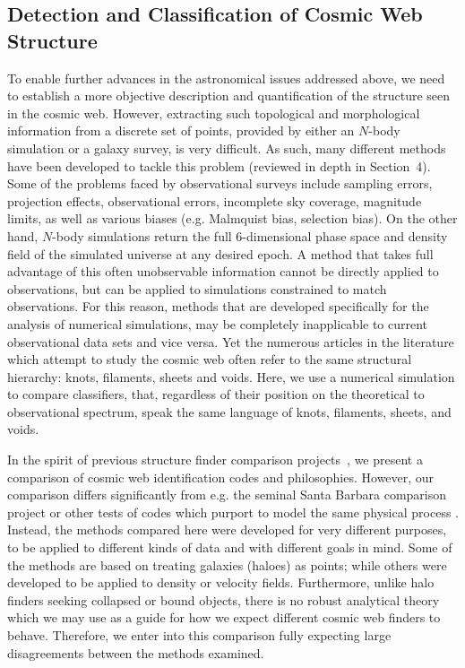 \subsection{Detection and Classification of Cosmic Web Structure}
To enable further advances in the astronomical issues addressed above, we need to establish a more objective description 
and quantification of the structure seen in the cosmic web. However, extracting such topological and morphological information 
from a discrete set of points, provided by either an $N$-body simulation or a galaxy survey, is very difficult. As such, many different methods have been developed to tackle this problem (reviewed in depth in Section~4). Some of the problems faced by observational surveys include sampling errors, projection effects, observational errors, incomplete sky coverage, magnitude limits, as well as various biases (e.g. Malmquist bias, selection bias). On the other hand, $N$-body simulations return the full 6-dimensional phase space and density field of the simulated universe at any desired epoch. 
 A method that takes full advantage of this often unobservable information cannot be directly applied to observations, but can be applied to simulations constrained to match observations. For this reason, methods that are developed specifically for the analysis of numerical simulations, may be completely inapplicable to current observational data sets and vice versa. Yet the numerous articles in the literature which attempt to study the cosmic web often refer to the same structural hierarchy: knots, filaments, sheets and voids. Here, we use a numerical simulation to compare classifiers, that, regardless of their position on the theoretical to observational spectrum, speak the same language of knots, filaments, sheets, and voids.


In the spirit of previous structure finder comparison projects~\citep[][etc.]{Colberg2008,Knebe2011a}, we present a comparison of cosmic web identification codes and philosophies. However, our comparison differs significantly from e.g. the seminal Santa Barbara comparison project \citep{1999ApJ...525..554F} or other tests of codes which purport to model the same physical process \citep[e.g.][]{2012MNRAS.423.1726S,Knebe2013}. Instead, the methods compared here were developed for very different purposes, to be applied to different kinds of data and with different goals in mind. Some of the methods are based on treating galaxies (haloes) as points; while others were developed to be applied to density or velocity fields. Furthermore, unlike halo finders seeking collapsed or bound objects, there is no robust analytical theory \cite[such as the spherical top hat collapse model of][]{1999MNRAS.308..119S} which we may use as a guide for how we expect different cosmic web finders to behave. Therefore, we enter into this comparison fully expecting large disagreements between the methods examined.

